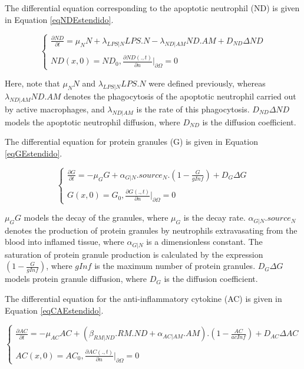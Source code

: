 \documentclass[10pt]{bmc_article}
\newenvironment{bmcformat}{\baselineskip20pt\sloppy\setboolean{publ}{false}}{\baselineskip20pt\sloppy}
\begin{document}
\begin{bmcformat}
The differential equation corresponding to the apoptotic neutrophil (ND) is given in Equation \ref{eqNDEstendido}.

\begin{equation}
\label{eqNDEstendido}
\begin{cases} 
\frac{\partial ND}{\partial t} = \mu_N N + \lambda_{LPS|N} LPS. N - \lambda_{ND|AM} ND.AM + D_{ND} \Delta ND  \\\\
ND(x,0) = ND_0, \frac{\partial ND(.,t)}{\partial n} |_{\partial\Omega} = 0 
\end{cases}
\end{equation}

Here, note that $\mu_N N$ and $\lambda _{LPS|N} LPS. N$ were defined previously, whereas $\lambda _{ND|AM} ND.AM$ denotes the 
phagocytosis of the apoptotic neutrophil carried out by active macrophages, and $\lambda _{ND|AM}$ is the rate of this phagocytosis. 
$D_{ND} \Delta ND$ models the apoptotic neutrophil diffusion, where $D_{ND}$ is the diffusion coefficient. 

The differential equation for protein granules (G) is given in Equation \ref{eqGEstendido}.

\begin{equation}
\label{eqGEstendido}
\begin{cases} 
\frac{\partial G}{\partial t} = -\mu_G G + \alpha _{G|N}.source_{N}.(1 - \frac{G}{gInf}) + D_{G} \Delta G \\\\
G(x,0) =  G_0, \frac{\partial G(.,t)}{\partial n} |_{\partial\Omega} = 0 
\end{cases}
\end{equation}

$\mu_G G$ models the decay of the granules, where $\mu_G$ is the decay rate. $\alpha _{G|N}.source_{N}$ denotes the production of 
protein granules by neutrophils extravasating from the blood into inflamed tissue, where $\alpha_{G|N}$ is a dimensionless constant. 
The saturation of protein granule production is calculated by the expression $(1 - \frac{G}{gInf})$, where $gInf$ is the maximum number 
of protein granules. $D_{G} \Delta G$ models protein granule diffusion, where $D_{G}$ is the diffusion coefficient.

The differential equation for the anti-inflammatory cytokine (AC) is given in Equation \ref{eqCAEstendido}.

\begin{equation}
\label{eqCAEstendido}
\begin{cases} 
\frac{\partial AC}{\partial t} = -\mu_{AC} AC + (\beta_{RM|ND}.RM.ND + \alpha_{AC|AM}.AM).(1 - \frac{AC}{acInf}) + D_{AC} \Delta AC \\\\
AC(x,0) =  AC_0, \frac{\partial AC(.,t)}{\partial n} |_{\partial\Omega} = 0 
\end{cases}
\end{equation}


\end{bmcformat}
\end{document}

